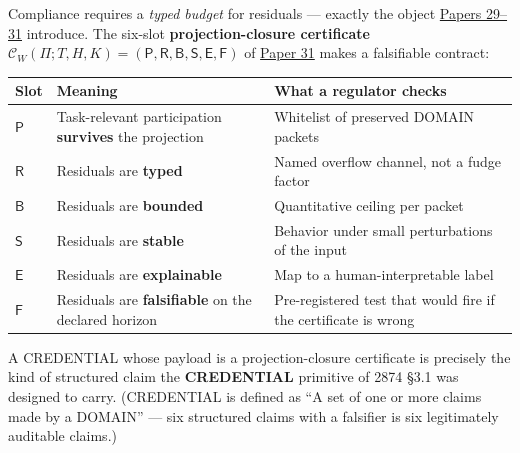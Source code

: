 \documentclass[
  letterpaper,
  11pt]{article}
\newcounter{none} %
\theoremstyle{plain}
\theoremstyle{definition}
\theoremstyle{remark}
\begin{document}
Compliance requires a \emph{typed budget} for residuals --- exactly the object \href{C:/Projects/simplicial/29.participation_metric_identity_as_participation.md}{Papers 29--31} introduce. The six-slot \textbf{projection-closure certificate} \(\mathcal{C}_W(\Pi; T, H, K) = (\mathsf{P}, \mathsf{R}, \mathsf{B}, \mathsf{S}, \mathsf{E}, \mathsf{F})\) of \href{C:/Projects/simplicial/31.projection_closure_theory.md}{Paper 31} makes a falsifiable contract:

{\def\LTcaptype{none} %
\begin{longtable}[]{@{}
  >{\raggedright\arraybackslash}p{}
  >{\raggedright\arraybackslash}p{}
  >{\raggedright\arraybackslash}p{}@{}}
\toprule\noalign{}
\begin{minipage}[b]{\linewidth}\raggedright
Slot
\end{minipage} & \begin{minipage}[b]{\linewidth}\raggedright
Meaning
\end{minipage} & \begin{minipage}[b]{\linewidth}\raggedright
What a regulator checks
\end{minipage} \\
\midrule\noalign{}
\endhead
\bottomrule\noalign{}
\endlastfoot
\(\mathsf{P}\) & Task-relevant participation \textbf{survives} the projection & Whitelist of preserved DOMAIN packets \\
\(\mathsf{R}\) & Residuals are \textbf{typed} & Named overflow channel, not a fudge factor \\
\(\mathsf{B}\) & Residuals are \textbf{bounded} & Quantitative ceiling per packet \\
\(\mathsf{S}\) & Residuals are \textbf{stable} & Behavior under small perturbations of the input \\
\(\mathsf{E}\) & Residuals are \textbf{explainable} & Map to a human-interpretable label \\
\(\mathsf{F}\) & Residuals are \textbf{falsifiable} on the declared horizon & Pre-registered test that would fire if the certificate is wrong \\
\end{longtable}
}

A CREDENTIAL whose payload is a projection-closure certificate is precisely the kind of structured claim the \textbf{CREDENTIAL} primitive of 2874 §3.1 was designed to carry. (CREDENTIAL is defined as ``A set of one or more claims made by a DOMAIN'' --- six structured claims with a falsifier is six legitimately auditable claims.)
\end{document}
